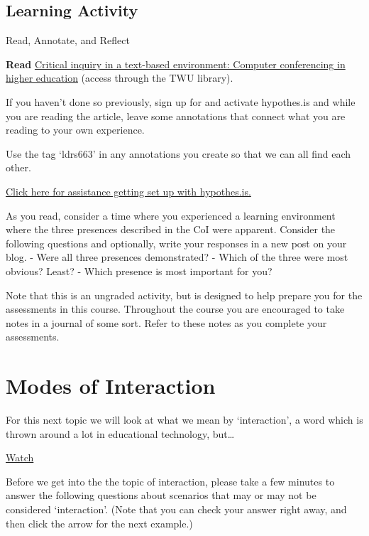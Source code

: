 \documentclass[
]{book}
\begin{document}
\hypertarget{learning-activity}{%
\subsection*{Learning Activity}\label{learning-activity}}

\begin{reflect}
{Read, Annotate, and Reflect}

\textbf{Read} \href{https://www-sciencedirect-com.twu.idm.oclc.org/science/article/pii/S1096751600000166}{Critical inquiry in a text-based environment: Computer conferencing in higher education} (access through the TWU library).

If you haven't done so previously, sign up for and activate hypothes.is and while you are reading the article, leave some annotations that connect what you are reading to your own experience.

Use the tag `ldrs663' in any annotations you create so that we can all find each other.

\href{http://create.twu.ca/help/other-web-tools/hypothesis}{Click here for assistance getting set up with hypothes.is.}

As you read, consider a time where you experienced a learning environment where the three presences described in the CoI were apparent. Consider the following questions and optionally, write your responses in a new post on your blog.
- Were all three presences demonstrated?
- Which of the three were most obvious? Least?
- Which presence is most important for you?

Note that this is an ungraded activity, but is designed to help prepare you for the assessments in this course. Throughout the course you are encouraged to take notes in a journal of some sort. Refer to these notes as you complete your assessments.
\end{reflect}

\hypertarget{modes-of-interaction}{%
\section{Modes of Interaction}\label{modes-of-interaction}}

For this next topic we will look at what we mean by `interaction', a word which is thrown around a lot in educational technology, but\ldots{}

\href{https://youtu.be/G2y8Sx4B2Sk}{Watch}

Before we get into the the topic of interaction, please take a few minutes to answer the following questions about scenarios that may or may not be considered `interaction'.
(Note that you can check your answer right away, and then click the arrow for the next example.)
\end{document}
